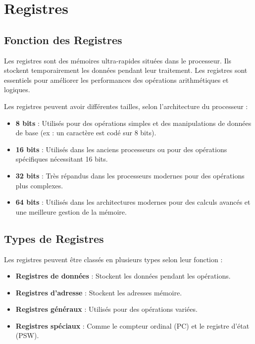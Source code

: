 \documentclass[10pt,a4paper]{article}
\begin{document}
\section*{Registres}

\subsection*{Fonction des Registres}

Les registres sont des mémoires ultra-rapides situées dans le processeur. Ils stockent temporairement les données pendant leur traitement. Les registres sont essentiels pour améliorer les performances des opérations arithmétiques et logiques.

Les registres peuvent avoir différentes tailles, selon l'architecture du processeur :
\begin{itemize}
    \item \textbf{8 bits} : Utilisés pour des opérations simples et des manipulations de données de base (ex : un caractère est codé sur 8 bits).
    \item \textbf{16 bits} : Utilisés dans les anciens processeurs ou pour des opérations spécifiques nécessitant 16 bits.
    \item \textbf{32 bits} : Très répandus dans les processeurs modernes pour des opérations plus complexes.
    \item \textbf{64 bits} : Utilisés dans les architectures modernes pour des calculs avancés et une meilleure gestion de la mémoire.
\end{itemize}


\subsection*{Types de Registres}

Les registres peuvent être classés en plusieurs types selon leur fonction :
\begin{itemize}
    \item \textbf{Registres de données} : Stockent les données pendant les opérations.
    \item \textbf{Registres d'adresse} : Stockent les adresses mémoire.
    \item \textbf{Registres généraux} : Utilisés pour des opérations variées.
    \item \textbf{Registres spéciaux} : Comme le compteur ordinal (PC) et le registre d'état (PSW).
\end{itemize}
\end{document}
